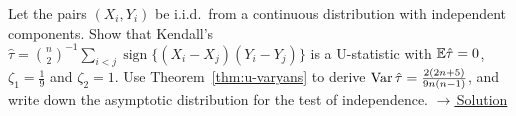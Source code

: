 \documentclass[main.tex]{subfiles}
\begin{document}
\begin{exercise}\label{exr:21-6}
Let the pairs $(X_i,Y_i)$ be i.i.d.\ from a continuous distribution with independent components. Show that Kendall's $\hat\tau=\binom n2^{-1}\sum_{i<j}\operatorname{sign}\{(X_i-X_j)(Y_i-Y_j)\}$ is a U-statistic with $\mathbb{E}\hat\tau=0$, $\zeta_1=\frac19$ and $\zeta_2=1$. Use Theorem~\ref{thm:u-varyans} to derive $\operatorname{Var}\hat\tau=\frac{2(2n+5)}{9n(n-1)}$, and write down the asymptotic distribution for the test of independence.
\hfill\hyperref[coz:21-6]{\footnotesize$\rightarrow$\,Solution}
\end{exercise}

\end{document}
